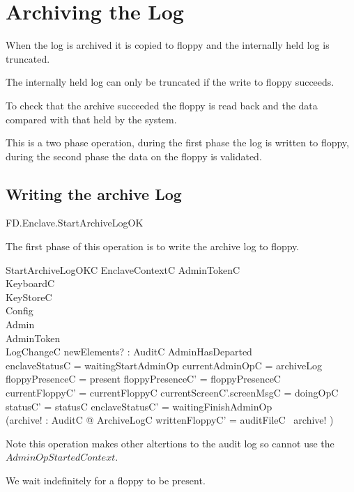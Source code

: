 \section{Archiving the Log}


When the log is archived it is copied to floppy and the internally
held log is truncated.

The internally held log can only be truncated if the write to floppy
succeeds.  

To check that the archive succeeded the floppy is read back and the
data compared with that held by the system.

This is a two phase operation, during the first phase the log is
written to floppy, during the second phase the data on the floppy is
validated. 


\subsection{Writing the archive Log}

\begin{traceunit}{FD.Enclave.StartArchiveLogOK}
\end{traceunit}

The first phase of this operation is to write the archive log to
floppy.

\begin{schema}{StartArchiveLogOKC}
        EnclaveContextC
\also
        \Xi AdminTokenC
\\      \Xi KeyboardC
\\      \Xi KeyStoreC
\\      \Xi Config
\\      \Xi Admin
\\      \Xi AdminToken     
\\      LogChangeC
\also
        newElements? : \finset AuditC
 \where
     \lnot AdminHasDeparted
 \\     enclaveStatusC = waitingStartAdminOp
\also
        \The currentAdminOpC = archiveLog
\\      floppyPresenceC = present
\also
        floppyPresenceC' = floppyPresenceC
\\      currentFloppyC' = currentFloppyC
\also
        currentScreenC'.screenMsgC = doingOpC
\also
        statusC' = statusC
\also
        enclaveStatusC' = waitingFinishAdminOp
\\      (\exists archive! : \finset AuditC @ ArchiveLogC \land
writtenFloppyC' = auditFileC~ archive! )
\end{schema}
\begin{Zcomment}
\item
Note this operation makes other altertions to the audit log so cannot use
the $AdminOpStartedContext$.
\end{Zcomment}
We wait indefinitely for a floppy to be present.

